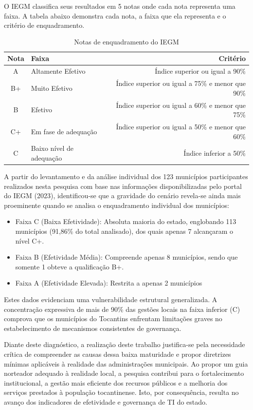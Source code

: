 O IEGM classifica seus resultados em 5 notas onde cada nota representa uma faixa. A tabela abaixo
demonstra cada nota, a faixa que ela representa e o critério de enquadramento.

\begin{table}[htb]
  \centering
  \caption{Notas de enquadramento do IEGM}
  \label{table:classificacao_iegm}
  \begin{tabular}{clr}
    \toprule
    \textbf{Nota} & \textbf{Faixa} & \textbf{Critério} \\
    \midrule
    A & Altamente Efetivo & Índice superior ou igual a 90\% \\
    B+ & Muito Efetivo & Índice superior ou igual a 75\% e menor que 90\% \\
    B & Efetivo & Índice superior ou igual a 60\% e menor que 75\% \\
    C+ & Em fase de adequação & Índice superior ou igual a 50\% e menor que 60\% \\
    C & Baixo nível de adequação & Índice inferior a 50\% \\
    \bottomrule
  \end{tabular}

\end{table}

A partir do levantamento e da análise individual dos 123 municípios participantes realizados nesta 
pesquisa com base nas informações disponibilizadas pelo portal do IEGM (2023), identificou-se que a 
gravidade do cenário revela-se ainda mais proeminente quando se analisa o enquadramento individual 
dos municípios:   

\begin{itemize}
  \item Faixa C (Baixa Efetividade): Absoluta maioria do estado, englobando 113 municípios 
  (91,86\% do total analisado), dos quais apenas 7 alcançaram o nível C+.

  \item Faixa B (Efetividade Média): Compreende apenas 8 municípios, sendo que somente 1 obteve a 
  qualificação B+.

  \item Faixa A (Efetividade Elevada): Restrita a apenas 2 municípios
\end{itemize}

Estes dados evidenciam uma vulnerabilidade estrutural generalizada. A concentração expressiva de 
mais de 90\% das gestões locais na faixa inferior (C) comprova que os municípios do Tocantins 
enfrentam limitações graves no estabelecimento de mecanismos consistentes de governança.

Diante deste diagnóstico, a realização deste trabalho justifica-se pela necessidade crítica de 
compreender as causas dessa baixa maturidade e propor diretrizes mínimas aplicáveis à realidade das 
administrações municipais. Ao propor um guia norteador adequado à realidade local, a pesquisa 
contribui para o fortalecimento institucional, a gestão mais eficiente dos recursos públicos e a 
melhoria dos serviços prestados à população tocantinense. Isto, por consequência, resulta no avanço 
dos indicadores de efetividade e governança de TI do estado.